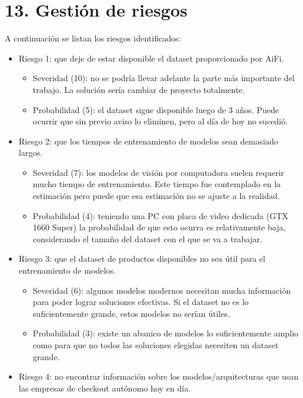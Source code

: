 \documentclass[
11pt, %
]{charter}
\begin{document}
\section{13. Gestión de riesgos}
\label{sec:riesgos}

A continuación se listan los riesgos identificados:

\begin{itemize}
\item Riesgo 1: que deje de estar disponible el dataset proporcionado por AiFi.
\begin{itemize}
\item Severidad (10): no se podría llevar adelante la parte más importante del trabajo. La solución sería cambiar de proyecto totalmente.
\item Probabilidad (5): el dataset sigue disponible luego de 3 años. Puede ocurrir que sin previo aviso lo eliminen, pero al día de hoy no sucedió.
\end{itemize}
\item Riesgo 2: que los tiempos de entrenamiento de modelos sean demasiado largos.
\begin{itemize}
\item Severidad (7): los modelos de visión por computadora suelen requerir mucho tiempo de entrenamiento. Este tiempo fue contemplado en la estimación pero puede que esa estimación no se ajuste a la realidad.
\item Probabilidad (4): teniendo una PC con placa de video dedicada (GTX 1660 Super) la probabilidad de que esto ocurra es relativamente baja, considerando el tamaño del dataset con el que se va a trabajar.
\end{itemize}
\item Riesgo 3: que el dataset de productos disponibles no sea útil para el entrenamiento de modelos.
\begin{itemize}
\item Severidad (6): algunos modelos modernos necesitan mucha información para poder lograr soluciones efectivas. Si el dataset no es lo suficientemente grande, estos modelos no serían útiles.
\item Probabilidad (3): existe un abanico de modelos lo suficientemente amplio como para que no todos las soluciones elegidas necesiten un dataset grande.
\end{itemize}
\item Riesgo 4: no encontrar información sobre los modelos/arquitecturas que usan las empresas de checkout autónomo hoy en día.
\begin{itemize}

\end{itemize}
\end{itemize}
\end{document}
